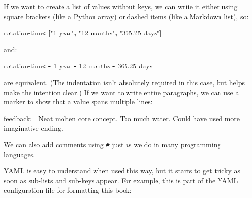\documentclass[
]{krantz}
\makeatletter
\newenvironment{Shaded}{\begin{snugshade}}{\end{snugshade}}
\newcommand{\AttributeTok}[1]{\textcolor[rgb]{0.77,0.63,0.00}{#1}}
\newcommand{\CharTok}[1]{\textcolor[rgb]{0.31,0.60,0.02}{#1}}
\newcommand{\FunctionTok}[1]{\textcolor[rgb]{0.00,0.00,0.00}{#1}}
\newcommand{\KeywordTok}[1]{\textcolor[rgb]{0.13,0.29,0.53}{\textbf{#1}}}
\newcommand{\NormalTok}[1]{#1}
\newcommand{\StringTok}[1]{\textcolor[rgb]{0.31,0.60,0.02}{#1}}
\newenvironment{kframe}{%
\medskip{}
\setlength{\fboxsep}{.8em}
 \def\at@end@of@kframe{}%
 \ifinner\ifhmode%
  \def\at@end@of@kframe{\end{minipage}}%
  \begin{minipage}{\columnwidth}%
 \fi\fi%
 \def\FrameCommand##1{\hskip\@totalleftmargin \hskip-\fboxsep
 \colorbox{shadecolor}{##1}\hskip-\fboxsep
     \hskip-\linewidth \hskip-\@totalleftmargin \hskip\columnwidth}%
 \MakeFramed {\advance\hsize-\width
   \@totalleftmargin\z@ \linewidth\hsize
   \@setminipage}}%
 {\par\unskip\endMakeFramed%
 \at@end@of@kframe}
\renewenvironment{Shaded}{\begin{kframe}}{\end{kframe}}
\makeatother
\begin{document}
If we want to create a list of values without keys,
we can write it either using square brackets (like a Python array)
or dashed items (like a Markdown list),
so:

\begin{Shaded}
\begin{Highlighting}[]
\FunctionTok{rotation{-}time}\KeywordTok{:}\AttributeTok{ }\KeywordTok{[}\StringTok{"1 year"}\KeywordTok{,}\AttributeTok{ }\StringTok{"12 months"}\KeywordTok{,}\AttributeTok{ }\StringTok{"365.25 days"}\KeywordTok{]}
\end{Highlighting}
\end{Shaded}

and:

\begin{Shaded}
\begin{Highlighting}[]
\FunctionTok{rotation{-}time}\KeywordTok{:}
\AttributeTok{    }\KeywordTok{{-}}\AttributeTok{ 1 year}
\AttributeTok{    }\KeywordTok{{-}}\AttributeTok{ 12 months}
\AttributeTok{    }\KeywordTok{{-}}\AttributeTok{ 365.25 days}
\end{Highlighting}
\end{Shaded}

are equivalent.
(The indentation isn't absolutely required in this case,
but helps make the intention clear.)
If we want to write entire paragraphs,
we can use a marker to show that a value spans multiple lines:

\begin{Shaded}
\begin{Highlighting}[]
\FunctionTok{feedback}\KeywordTok{: }\CharTok{|}
\NormalTok{    Neat molten core concept.}
\NormalTok{    Too much water.}
\NormalTok{    Could have used more imaginative ending.}
\end{Highlighting}
\end{Shaded}

We can also add comments using \texttt{\#} just as we do in many programming languages.

YAML is easy to understand when used this way,
but it starts to get tricky as soon as sub-lists and sub-keys appear.
For example,
this is part of the YAML configuration file for formatting this book:
\end{document}
